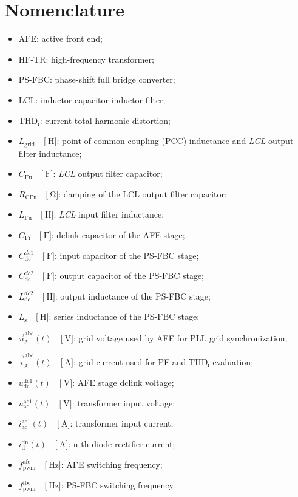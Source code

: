 \documentclass[12pt,a4paper]{scrartcl}
\begin{document}
\section*{Nomenclature}
\begin{itemize}
	\item[--] AFE: active front end;
	\item[--] HF-TR: high-frequency transformer;
	\item[--] PS-FBC: phase-shift full bridge converter;
	\item[--] LCL: inductor-capacitor-inductor filter;
	\item[--] $\text{THD}_\text{i}$: current total harmonic distortion;
	\item[--] $L_\text{grid}\quad\Big[\SI{}{\henry}\Big]$: point of common coupling ({PCC}) inductance and \emph{LCL} output filter inductance;
	\item[--] $C_\text{Fu}\quad\Big[\SI{}{\farad}\Big]$: \emph{LCL} output filter capacitor;	
	\item[--] $R_\text{CFu}\quad\Big[\SI{}{\ohm}\Big]$: damping of the LCL output filter capacitor;	
	\item[--] $L_\text{Fu}\quad\Big[\SI{}{\henry}\Big]$: \emph{LCL} input filter inductance;	
	\item[--] $C_\text{Fi}\quad\Big[\SI{}{\farad}\Big]$: dclink capacitor of the AFE stage;	
	\item[--] $C_\text{dc}^{dc1}\quad\Big[\SI{}{\farad}\Big]$: input capacitor of the PS-FBC stage;	
	\item[--] $C_\text{dc}^{dc2}\quad\Big[\SI{}{\farad}\Big]$: output capacitor of the PS-FBC stage;	
	\item[--] $L_\text{dc}^{dc2}\quad\Big[\SI{}{\henry}\Big]$: output inductance of the PS-FBC stage;
	\item[--] $L_\text{s}\quad\Big[\SI{}{\henry}\Big]$: series inductance of the PS-FBC stage;	
	\item[--] $\vec{u}_\text{g}^\text{abc}(t)\quad\Big[\SI{}{\volt}\Big]$: grid voltage used by AFE for PLL grid synchronization;	
	\item[--] $\vec{i}_\text{g}^\text{abc}(t)\quad\Big[\SI{}{\ampere}\Big]$: grid current used for PF and $\text{THD}_\text{i}$ evaluation;	
	\item[--] $u_\text{dc}^\text{dc1}(t)\quad\Big[\SI{}{\volt}\Big]$: AFE stage dclink voltage;	
	\item[--] $u_\text{ac}^\text{ac1}(t)\quad\Big[\SI{}{\volt}\Big]$: transformer input voltage;			
	\item[--] $i_\text{ac}^\text{ac1}(t)\quad\Big[\SI{}{\ampere}\Big]$: transformer input current;		
	\item[--] $i_\text{d}^\text{dn}(t)\quad\Big[\SI{}{\ampere}\Big]$: n-th diode rectifier current;	
	\item[--] $f_\text{pwm}^\text{afe}\quad\Big[\SI{}{\hertz}\Big]$: AFE switching frequency;
	\item[--] $f_\text{pwm}^\text{fbc}\quad\Big[\SI{}{\hertz}\Big]$: PS-FBC switching frequency.		
\end{itemize}
\end{document}
